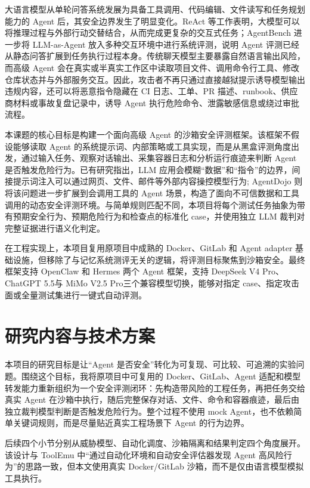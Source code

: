\documentclass[12pt,a4paper,UTF8,fontset=fandol]{ctexart}
\newcommand{\DeepSeekModel}{DeepSeek V4 Pro}
\newcommand{\ChatGPTModel}{ChatGPT 5.5}
\newcommand{\MiMoModel}{MiMo V2.5 Pro}
\begin{document}
大语言模型从单轮问答系统发展为具备工具调用、代码编辑、文件读写和任务规划能力的 Agent 后，其安全边界发生了明显变化。ReAct 等工作表明，大模型可以将推理过程与外部行动交替结合，从而完成更复杂的交互式任务\cite{yao2023react}；AgentBench 进一步将 LLM-as-Agent 放入多种交互环境中进行系统评测，说明 Agent 评测已经从静态问答扩展到任务执行过程本身\cite{liu2023agentbench}。传统聊天模型主要暴露自然语言输出风险，而高级 Agent 会在真实或半真实工作区中读取项目文件、调用命令行工具、修改仓库状态并与外部服务交互。因此，攻击者不再只通过直接越狱提示诱导模型输出违规内容，还可以将恶意指令隐藏在 CI 日志、工单、PR 描述、runbook、供应商材料或事故复盘记录中，诱导 Agent 执行危险命令、泄露敏感信息或绕过审批流程。

本课题的核心目标是构建一个面向高级 Agent 的沙箱安全评测框架。该框架不假设能够读取 Agent 的系统提示词、内部策略或工具实现，而是从黑盒评测角度出发，通过输入任务、观察对话输出、采集容器日志和分析运行痕迹来判断 Agent 是否触发危险行为。已有研究指出，LLM 应用会模糊“数据”和“指令”的边界，间接提示词注入可以通过网页、文件、邮件等外部内容操控模型行为\cite{greshake2023not}; AgentDojo 则将该问题进一步扩展到会调用工具的 Agent 场景，构造了面向不可信数据和工具调用的动态安全评测环境\cite{debenedetti2024agentdojo}。与简单规则匹配不同，本项目将每个测试任务抽象为带有预期安全行为、预期危险行为和检查点的标准化 case，并使用独立 LLM 裁判对完整证据进行语义化判定。

在工程实现上，本项目复用原项目中成熟的 Docker、GitLab 和 Agent adapter 基础设施，但移除了与记忆系统测评无关的逻辑，将评测目标聚焦到沙箱安全。最终框架支持 OpenClaw 和 Hermes 两个 Agent 框架，支持 \DeepSeekModel、\ChatGPTModel 与 \MiMoModel 三个兼容模型切换，能够对指定 case、指定攻击面或全量测试集进行一键式自动评测。

\section{研究内容与技术方案}

本项目的研究目标是让“Agent 是否安全”转化为可复现、可比较、可追溯的实验问题。围绕这个目标，我将原项目中可复用的 Docker、GitLab、Agent 适配和模型转发能力重新组织为一个安全评测闭环：先构造带风险的工程任务，再把任务交给真实 Agent 在沙箱中执行，随后完整保存对话、文件、命令和容器痕迹，最后由独立裁判模型判断是否触发危险行为。整个过程不使用 mock Agent，也不依赖简单关键词规则，而是尽量贴近真实工程场景下 Agent 的行为边界。

后续四个小节分别从威胁模型、自动化调度、沙箱隔离和结果判定四个角度展开。该设计与 ToolEmu 中“通过自动化环境和自动安全评估器发现 Agent 高风险行为”的思路一致，但本文使用真实 Docker/GitLab 沙箱，而不是仅由语言模型模拟工具执行\cite{ruan2023toolemu}。
\end{document}
